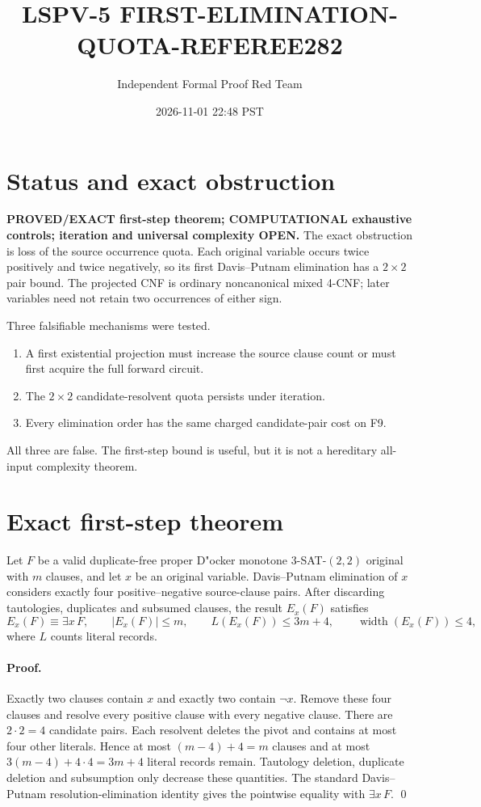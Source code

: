 \documentclass[11pt]{article}
\title{LSPV-5 FIRST-ELIMINATION-QUOTA-REFEREE282}
\author{Independent Formal Proof Red Team}
\date{2026-11-01 22:48 PST}
\begin{document}
\maketitle

\section{Status and exact obstruction}

\textbf{PROVED/EXACT first-step theorem; COMPUTATIONAL exhaustive controls;
iteration and universal complexity OPEN.}  The exact obstruction is loss of
the source occurrence quota.  Each original variable occurs twice positively
and twice negatively, so its first Davis--Putnam elimination has a $2\times2$
pair bound.  The projected CNF is ordinary noncanonical mixed 4-CNF; later
variables need not retain two occurrences of either sign.

Three falsifiable mechanisms were tested.
\begin{enumerate}
\item A first existential projection must increase the source clause count or
must first acquire the full forward circuit.
\item The $2\times2$ candidate-resolvent quota persists under iteration.
\item Every elimination order has the same charged candidate-pair cost on F9.
\end{enumerate}
All three are false.  The first-step bound is useful, but it is not a
hereditary all-input complexity theorem.

\section{Exact first-step theorem}

Let $F$ be a valid duplicate-free proper D"ocker monotone
$3$-SAT-$(2,2)$ original with $m$ clauses, and let $x$ be an original
variable.  Davis--Putnam elimination of $x$ considers exactly four
positive--negative source-clause pairs.  After discarding tautologies,
duplicates and subsumed clauses, the result $E_x(F)$ satisfies
\[
 E_x(F)\equiv \exists x\,F,\qquad
 |E_x(F)|\le m,\qquad
 L(E_x(F))\le 3m+4,\qquad
 \operatorname{width}(E_x(F))\le4,
\]
where $L$ counts literal records.

\paragraph{Proof.}
Exactly two clauses contain $x$ and exactly two contain $\neg x$.  Remove
these four clauses and resolve every positive clause with every negative
clause.  There are $2\cdot2=4$ candidate pairs.  Each resolvent deletes the
pivot and contains at most four other literals.  Hence at most
$(m-4)+4=m$ clauses and at most $3(m-4)+4\cdot4=3m+4$ literal records remain.
Tautology deletion, duplicate deletion and subsumption only decrease these
quantities.  The standard Davis--Putnam resolution-elimination identity gives
the pointwise equality with $\exists x\,F$. \qed
\end{document}
